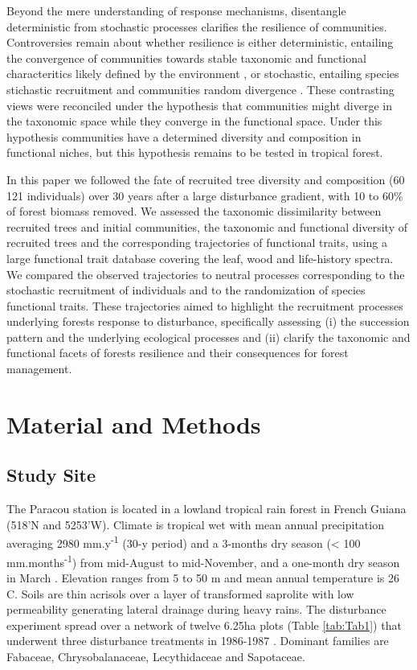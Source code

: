 \documentclass[fleqn,10pt]{ArtEcoFoG} %
\begin{document}
Beyond the mere understanding of response mechanisms, disentangle
deterministic from stochastic processes clarifies the resilience of
communities. Controversies remain about whether resilience is either
deterministic, entailing the convergence of communities towards stable
taxonomic and functional characteritics likely defined by the
environment \citep{Clements1916}, or stochastic, entailing species
stichastic recruitment and communities random divergence
\citep{Diamond1975}. These contrasting views were reconciled under the
hypothesis that communities might diverge in the taxonomic space while
they converge in the functional space. Under this hypothesis communities
have a determined diversity and composition in functional niches, but
this hypothesis remains to be tested in tropical forest.

In this paper we followed the fate of recruited tree diversity and
composition (60 121 individuals) over 30 years after a large disturbance
gradient, with 10 to 60\% of forest biomass removed. We assessed the
taxonomic dissimilarity between recruited trees and initial communities,
the taxonomic and functional diversity of recruited trees and the
corresponding trajectories of functional traits, using a large
functional trait database covering the leaf, wood and life-history
spectra. We compared the observed trajectories to neutral processes
corresponding to the stochastic recruitment of individuals and to the
randomization of species functional traits. These trajectories aimed to
highlight the recruitment processes underlying forests response to
disturbance, specifically assessing (i) the succession pattern and the
underlying ecological processes and (ii) clarify the taxonomic and
functional facets of forests resilience and their consequences for
forest management.

\section{Material and Methods}\label{material-and-methods}

\subsection{Study Site}\label{study-site}

The Paracou station is located in a lowland tropical rain forest in
French Guiana (518'N and 5253'W). Climate is tropical wet with mean
annual precipitation averaging 2980 mm.y\textsuperscript{-1} (30-y
period) and a 3-months dry season (\textless{} 100
mm.months\textsuperscript{-1}) from mid-August to mid-November, and a
one-month dry season in March \citep{Wagner2011}. Elevation ranges from
5 to 50 m and mean annual temperature is 26 C. Soils are thin acrisols
over a layer of transformed saprolite with low permeability generating
lateral drainage during heavy rains. The disturbance experiment spread
over a network of twelve 6.25ha plots (Table \ref{tab:Tab1}) that
underwent three disturbance treatments in 1986-1987 \citep{Herault2018}.
Dominant families are Fabaceae, Chrysobalanaceae, Lecythidaceae and
Sapotaceae.
\end{document}
